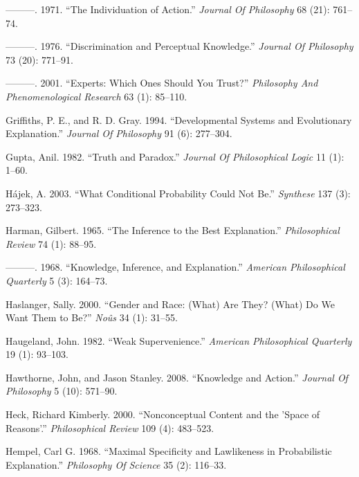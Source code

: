 \documentclass[
  10pt,
  letterpaper,
  DIV=11,
  numbers=noendperiod,
  twoside]{scrartcl}
\newlength{\cslhangindent}
\newenvironment{CSLReferences}[2] %
 {\begin{list}{}{%
  \setlength{\itemindent}{0pt}
  \setlength{\leftmargin}{0pt}
  \setlength{\parsep}{0pt}
  \ifodd #1
   \setlength{\leftmargin}{\cslhangindent}
   \setlength{\itemindent}{-1\cslhangindent}
  \fi
  \setlength{\itemsep}{#2\baselineskip}}}
 {\end{list}}
\begin{document}
\begin{CSLReferences}{1}{0}
---------. 1971. {``The Individuation of Action.''} \emph{Journal Of
Philosophy} 68 (21): 761--74.

---------. 1976. {``Discrimination and Perceptual Knowledge.''}
\emph{Journal Of Philosophy} 73 (20): 771--91.

---------. 2001. {``Experts: Which Ones Should You Trust?''}
\emph{Philosophy And Phenomenological Research} 63 (1): 85--110.

Griffiths, P. E., and R. D. Gray. 1994. {``Developmental Systems and
Evolutionary Explanation.''} \emph{Journal Of Philosophy} 91 (6):
277--304.

Gupta, Anil. 1982. {``Truth and Paradox.''} \emph{Journal Of
Philosophical Logic} 11 (1): 1--60.

Hájek, A. 2003. {``What Conditional Probability Could Not Be.''}
\emph{Synthese} 137 (3): 273--323.

Harman, Gilbert. 1965. {``The Inference to the Best Explanation.''}
\emph{Philosophical Review} 74 (1): 88--95.

---------. 1968. {``Knowledge, Inference, and Explanation.''}
\emph{American Philosophical Quarterly} 5 (3): 164--73.

Haslanger, Sally. 2000. {``Gender and Race: (What) Are They? (What) Do
We Want Them to Be?''} \emph{Noûs} 34 (1): 31--55.

Haugeland, John. 1982. {``Weak Supervenience.''} \emph{American
Philosophical Quarterly} 19 (1): 93--103.

Hawthorne, John, and Jason Stanley. 2008. {``Knowledge and Action.''}
\emph{Journal Of Philosophy} 5 (10): 571--90.

Heck, Richard Kimberly. 2000. {``Nonconceptual Content and the 'Space of
Reasons'.''} \emph{Philosophical Review} 109 (4): 483--523.

Hempel, Carl G. 1968. {``Maximal Specificity and Lawlikeness in
Probabilistic Explanation.''} \emph{Philosophy Of Science} 35 (2):
116--33.


\end{CSLReferences}
\end{document}
